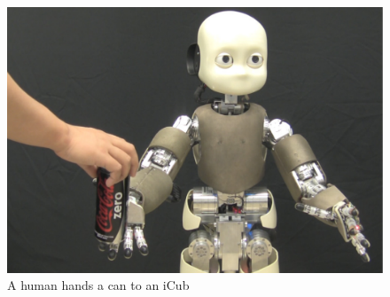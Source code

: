 
\begin{figure}
  \centering
  \includegraphics[width=12cm]{./fig_cha3/handover.pdf}
  \caption{A human hands a can to an iCub}
  \label{handover}
\end{figure}












